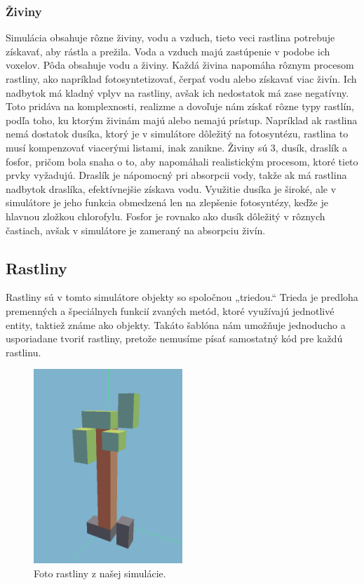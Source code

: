 \documentclass[12pt]{article}
\begin{document}
\subsubsection{Živiny}

Simulácia obsahuje rôzne živiny, vodu a vzduch, tieto veci rastlina potrebuje
získavať, aby rástla a prežila. Voda a vzduch majú zastúpenie v podobe ich
voxelov. Pôda obsahuje vodu a živiny. Každá živina napomáha rôznym procesom
rastliny, ako napríklad fotosyntetizovať, čerpať vodu alebo získavať viac živín.
Ich nadbytok má kladný vplyv na rastliny, avšak ich nedostatok má zase
negatívny. Toto pridáva na komplexnosti, realizme a dovoľuje nám získať rôzne
typy rastlín, podľa toho, ku ktorým živinám majú alebo nemajú prístup.
Napríklad ak rastlina nemá dostatok dusíka, ktorý je v simulátore dôležitý
na fotosyntézu, rastlina to musí kompenzovať viacerými listami, inak zanikne.
Živiny sú 3, dusík, draslík a fosfor, pričom bola snaha o to, aby napomáhali
realistickým procesom, ktoré tieto prvky vyžadujú. Draslík je nápomocný pri
absorpcii vody, takže ak má rastlina nadbytok draslíka, efektívnejšie získava
vodu. Využitie dusíka je široké, ale v simulátore je jeho funkcia obmedzená
len na zlepšenie fotosyntézy, keďže je hlavnou zložkou chlorofylu. Fosfor je
rovnako ako dusík dôležitý v rôznych častiach, avšak v simulátore je zameraný
na absorpciu živín.

\newpage
\subsection{Rastliny}

Rastliny sú v tomto simulátore objekty so spoločnou „triedou.“ Trieda je
predloha premenných a špeciálnych funkcií zvaných metód, ktoré využívajú
jednotlivé entity, taktiež známe ako objekty. Takáto šablóna nám umožňuje
jednoducho a usporiadane tvoriť rastliny, pretože nemusíme písať samostatný
kód pre každú rastlinu.

\begin{figure}[ht]
	\centering
	\includegraphics[width=0.5\textwidth]{res/plant.png}
	\caption{Foto rastliny z našej simulácie.}
\end{figure}
\end{document}
